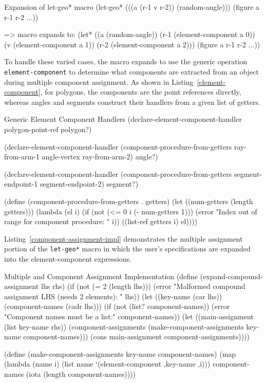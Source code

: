 \begin{repl-example}
[label=letgeo-expansion]
{Expansion of let-geo* macro}
(let-geo* (((a (r-1 v r-2)) (random-angle)))
  (figure a r-1 r-2 ...))

=> macro expands to:
(let* ((a (random-angle))
       (r-1 (element-component a 0))
       (v   (element-component a 1))
       (r-2 (element-component a 2)))
  (figure a r-1 r-2 ...))
\end{repl-example}

To handle these varied cases, the macro expands to use the generic operation
\texttt{element-component} to determine what components are extracted
from an object during multiple component assignment. As shown in
Listing~\ref{element-component}, for polygons, the components are the
point references directly, whereas angles and segments construct their
handlers from a given list of getters.

\begin{code-listing}
[label=element-component]
{Generic Element Component Handlers}
(declare-element-component-handler polygon-point-ref polygon?)

(declare-element-component-handler
 (component-procedure-from-getters
   ray-from-arm-1 angle-vertex ray-from-arm-2)
 angle?)

(declare-element-component-handler
 (component-procedure-from-getters
   segment-endpoint-1 segment-endpoint-2)
 segment?)

(define (component-procedure-from-getters . getters)
  (let ((num-getters (length getters)))
    (lambda (el i)
      (if (not (<= 0 i (- num-getters 1)))
          (error "Index out of range for component procedure: " i))
      ((list-ref getters i) el))))
\end{code-listing}

Listing~\ref{component-assignment-impl} demonstrates the multiple
assignment portion of the \texttt{let-geo*} macro in which the user's
specifications are expanded into the element-component expressions.

\begin{code-listing}
[label=component-assignment-impl]
{Multiple and Component Assignment Implementation}
(define (expand-compound-assignment lhs rhs)
  (if (not (= 2 (length lhs)))
      (error "Malformed compound assignment LHS (needs 2 elements): " lhs))
  (let ((key-name (car lhs))
        (component-names (cadr lhs)))
    (if (not (list? component-names))
        (error "Component names must be a list:" component-names))
    (let ((main-assignment (list key-name rhs))
          (component-assignments
           (make-component-assignments key-name component-names)))
      (cons main-assignment
            component-assignments))))

(define (make-component-assignments key-name component-names)
  (map (lambda (name i)
         (list name `(element-component ,key-name ,i)))
       component-names
       (iota (length component-names))))
\end{code-listing}

